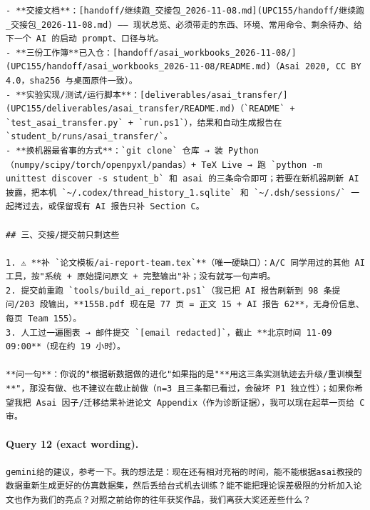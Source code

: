 \documentclass[UTF8,10pt]{ctexart}
\begin{document}
\begin{Verbatim}[breaklines=true,breakanywhere=true,fontsize=\scriptsize,frame=single,framesep=2pt]
- **交接文档**：[handoff/继续跑_交接包_2026-11-08.md](UPC155/handoff/继续跑_交接包_2026-11-08.md) —— 现状总览、必须带走的东西、环境、常用命令、剩余待办、给下一个 AI 的启动 prompt、口径与坑。
- **三份工作簿**已入仓：[handoff/asai_workbooks_2026-11-08/](UPC155/handoff/asai_workbooks_2026-11-08/README.md)（Asai 2020, CC BY 4.0，sha256 与桌面原件一致）。
- **实验实现/测试/运行脚本**：[deliverables/asai_transfer/](UPC155/deliverables/asai_transfer/README.md)（`README` + `test_asai_transfer.py` + `run.ps1`），结果和自动生成报告在 `student_b/runs/asai_transfer/`。
- **换机器最省事的方式**：`git clone` 仓库 → 装 Python（numpy/scipy/torch/openpyxl/pandas）+ TeX Live → 跑 `python -m unittest discover -s student_b` 和 asai 的三条命令即可；若要在新机器刷新 AI 披露，把本机 `~/.codex/thread_history_1.sqlite` 和 `~/.dsh/sessions/` 一起拷过去，或保留现有 AI 报告只补 Section C。

## 三、交接/提交前只剩这些

1. ⚠ **补 `论文模板/ai-report-team.tex`**（唯一硬缺口）：A/C 同学用过的其他 AI 工具，按"系统 + 原始提问原文 + 完整输出"补；没有就写一句声明。
2. 提交前重跑 `tools/build_ai_report.ps1`（我已把 AI 报告刷新到 98 条提问/203 段输出，**155B.pdf 现在是 77 页 = 正文 15 + AI 报告 62**，无身份信息、每页 Team 155）。
3. 人工过一遍图表 → 邮件提交 `[email redacted]`，截止 **北京时间 11-09 09:00**（现在约 19 小时）。

**问一句**：你说的"根据新数据做的进化"如果指的是"**用这三条实测轨迹去升级/重训模型**"，那没有做、也不建议在截止前做（n=3 且三条都已看过，会破坏 P1 独立性）；如果你希望我把 Asai 因子/迁移结果补进论文 Appendix（作为诊断证据），我可以现在起草一页给 C 审。
\end{Verbatim}

\paragraph{Query 12 (exact wording).}
\begin{Verbatim}[breaklines=true,breakanywhere=true,fontsize=\scriptsize,frame=single,framesep=2pt]
gemini给的建议，参考一下。我的想法是：现在还有相对充裕的时间，能不能根据asai教授的数据重新生成更好的仿真数据集，然后丢给台式机去训练？能不能把理论误差极限的分析加入论文也作为我们的亮点？对照之前给你的往年获奖作品，我们离获大奖还差些什么？
\end{Verbatim}
\end{document}
